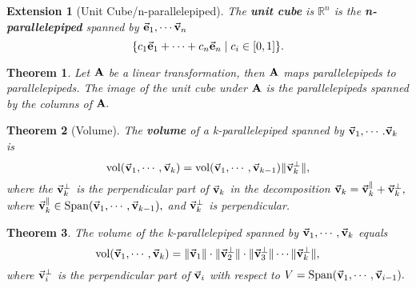 \documentclass[12pt, a4paper]{article}
\newtheorem{thm}{Theorem}[subsection]
\newtheorem*{ext}{\indent Extension}
\def\R{{\mathbb{R}}}
\def\Span{\mathrm{Span}}
\def\vol{\mathrm{vol}}
\def\vecv{\va{v}}
\def\vece{\va{e}}
\def\matrixA{\vb{A}}
\begin{document}
\begin{ext}[Unit Cube/n-parallelepiped] The \textbf{unit cube} is $\R^n$ is the \textbf{n-parallelepiped} spanned by $\vece_1,\cdots\vecv_n$\[\qty{c_1\vece_1+\cdots+c_n\vece_n\mid c_i\in\qty[0,1]}.\]\end{ext}
\begin{thm}
	Let $\matrixA$ be a linear transformation, then $\matrixA$ maps parallelepipeds to parallelepipeds. The image of the unit cube under $\matrixA$ is the parallelepipeds spanned by the columns of $\matrixA.$	
\end{thm}
\begin{thm}[Volume]
	The \textbf{volume} of a k-parallelepiped spanned by $\vecv_1,\cdots.\vecv_k$ is \[\vol\qty(\vecv_1,\cdots,\vecv_k)=\vol\qty(\vecv_1,\cdots,\vecv_{k-1})\|\vecv_k^\perp\|,\] where the $\vecv_k^\perp$ is the perpendicular part of $\vecv_k$ in the decomposition $\vecv_k=\vecv_k^\parallel+\vecv_k^\perp,$ where $\vecv_k^\parallel\in\Span\qty(\vecv_1,\cdots,\vecv_{k-1}),$ and $\vecv_k^\perp$ is perpendicular. 
\end{thm}
\begin{thm}
	The volume of the k-parallelepiped spanned by $\vecv_1,\cdots,\vecv_k$ equals \[\vol\qty(\vecv_1,\cdots,\vecv_k)=\|\vecv_1\|\cdot\|\vecv_2^\perp\|\cdot\|\vecv_3^\perp\|\cdots\|\vecv_k^\perp\|,\]	where $\vecv_i^\perp$ is the perpendicular part of $\vecv_i$ with respect to $V=\Span\qty(\vecv_1,\cdots,\vecv_{i-1}).$
\end{thm}
\end{document}
